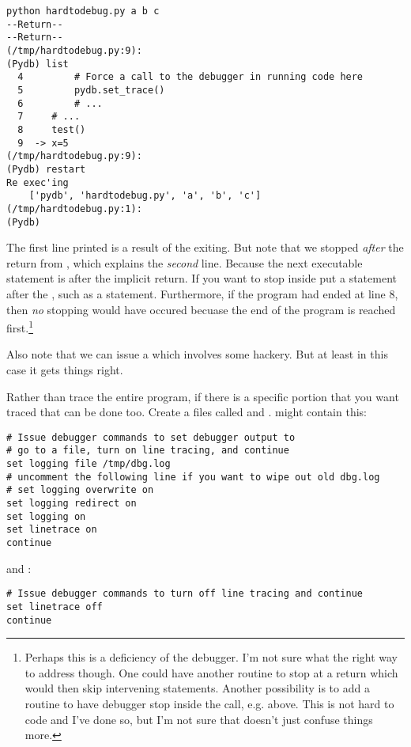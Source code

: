\begin{verbatim}
python hardtodebug.py a b c
--Return--
--Return--
(/tmp/hardtodebug.py:9):
(Pydb) list
  4         # Force a call to the debugger in running code here
  5         pydb.set_trace()
  6         # ...
  7     # ...
  8     test()
  9  -> x=5
(/tmp/hardtodebug.py:9): 
(Pydb) restart
Re exec'ing
	['pydb', 'hardtodebug.py', 'a', 'b', 'c']
(/tmp/hardtodebug.py:1): 
(Pydb) 
\end{verbatim}

The first  line printed is a result of the
 exiting. But note that we stopped \emph{after\/} the
return from , which explains the \emph{second\/}
 line. Because the next executable statement is after
the implicit return. If you want to stop inside  put a
statement after the , such as a 
statement. Furthermore, if the program had ended at line 8, then
\emph{no\/} stopping would have occured becuase the end of the program
is reached first.\footnote{Perhaps this is a deficiency of the
debugger. I'm not sure what the right way to address though. One could
have another routine to stop at a return which would then skip
intervening statements. Another possibility is to add a routine to
have debugger stop inside the call, e.g.  above. This
is not hard to code and I've done so, but I'm not sure that doesn't
just confuse things more.}

Also note that we can issue a  which involves some
hackery. But at least in this case it gets things right.

Rather than trace the entire program, if there is a specific portion
that you want traced that can be done too. Create a files called
 and . 
might contain this:

\begin{verbatim}
# Issue debugger commands to set debugger output to
# go to a file, turn on line tracing, and continue
set logging file /tmp/dbg.log
# uncomment the following line if you want to wipe out old dbg.log
# set logging overwrite on
set logging redirect on
set logging on
set linetrace on
continue
\end{verbatim}

and :

\begin{verbatim}
# Issue debugger commands to turn off line tracing and continue
set linetrace off
continue
\end{verbatim}

